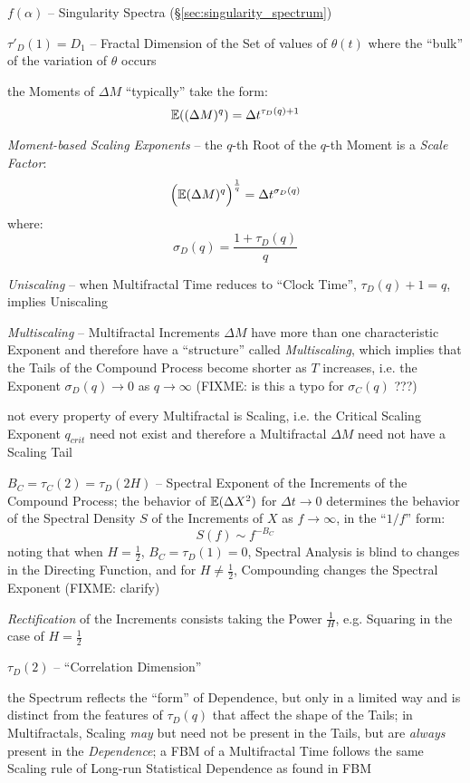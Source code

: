 $f(\alpha)$ -- Singularity Spectra (\S\ref{sec:singularity_spectrum})

$\tau'_D(1) = D_1$ -- Fractal Dimension of the Set of values of $\theta(t)$
where the ``bulk'' of the variation of $\theta$ occurs

the Moments of $\Delta M$ ``typically'' take the form:
\[
  \mathbb{E}((\Delta M)^q) = \Delta t^{\tau_D(q) + 1}
\]

\emph{Moment-based Scaling Exponents} -- the $q$-th Root of the $q$-th Moment is
a \emph{Scale Factor}:
\[
  \Big(\mathbb{E}(\Delta M)^q\Big)^\frac{1}{q} = \Delta t^{\sigma_D(q)}
\]
where:
\[
  \sigma_D(q) = \frac{1 + \tau_D(q)}{q}
\]

\emph{Uniscaling} -- when Multifractal Time reduces to ``Clock Time'',
$\tau_D(q) + 1 = q$, implies Uniscaling

\emph{Multiscaling} -- Multifractal Increments $\Delta M$ have more than one
characteristic Exponent and therefore have a ``structure'' called
\emph{Multiscaling}, which implies that the Tails of the Compound Process become
shorter as $T$ increases, i.e. the Exponent $\sigma_D(q) \to 0$ as
$q \to \infty$ (FIXME: is this a typo for $\sigma_C(q)$ ???)

not every property of every Multifractal is Scaling, i.e. the Critical Scaling
Exponent $q_{crit}$ need not exist and therefore a Multifractal $\Delta M$ need
not have a Scaling Tail

$B_C = \tau_C(2) = \tau_D(2H)$ -- Spectral Exponent of the Increments of the
Compound Process; the behavior of $\mathbb{E}(\Delta X^2)$ for $\Delta t \to 0$
determines the behavior of the Spectral Density $S$ of the Increments of $X$ as
$f \to \infty$, in the ``$1/f$'' form:
\[
  S(f) \sim f^{-B_C}
\]
noting that when $H = \frac{1}{2}$, $B_C = \tau_D(1) = 0$, Spectral Analysis is
blind to changes in the Directing Function, and for $H \neq \frac{1}{2}$,
Compounding changes the Spectral Exponent (FIXME: clarify)

\emph{Rectification} of the Increments consists taking the Power $\frac{1}{H}$,
e.g. Squaring in the case of $H = \frac{1}{2}$

$\tau_D(2)$ -- ``Correlation Dimension''

the Spectrum reflects the ``form'' of Dependence, but only in a limited way and
is distinct from the features of $\tau_D(q)$ that affect the shape of the Tails;
in Multifractals, Scaling \emph{may} but need not be present in the Tails, but
are \emph{always} present in the \emph{Dependence}; a FBM of a Multifractal Time
follows the same Scaling rule of Long-run Statistical Dependence as found in FBM


